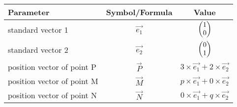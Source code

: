 \begin{tabular}{|l|c|c|}

\hline
\textbf{Parameter} & \textbf{Symbol/Formula} & \textbf{Value} \\
\hline
standard vector 1 & $\vec{e_1}$ & $\begin{pmatrix}1\\0\end{pmatrix}$ \\
\hline
standard vector 2 & $\vec{e_2}$ & $\begin{pmatrix}0\\1\end{pmatrix}$ \\
\hline
position vector of point P & $\vec{P}$ & $3\times\vec{e_1}+2\times\vec{e_2}$ \\
\hline
position vector of point M & $\vec{M}$ & $p\times \vec{e_1}+0\times\vec{e_2}$\\
\hline
position vector of point N & $\vec{N}$ & $0\times\vec{e_1}+q\times\vec{e_2}$\\
\hline

\end{tabular}
